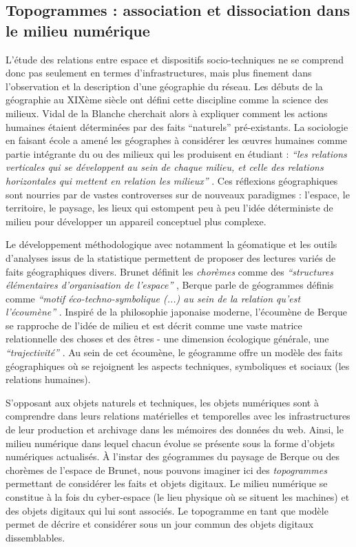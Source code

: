 \subsection[Topogrammes : association et dissociation dans le milieu numérique]{Topogrammes : association et dissociation dans le milieu numérique}

L’étude des relations entre espace et dispositifs socio-techniques ne se comprend donc pas seulement en termes d’infrastructures, mais plus finement dans l’observation et la description d’une géographie du réseau. Les débuts de la géographie au XIXème siècle ont défini cette discipline comme la science des milieux. Vidal de la Blanche cherchait alors à expliquer comment les actions humaines étaient déterminées par des faits ``naturels'' pré-existants. La sociologie en faisant école a amené les géographes à considérer les œuvres humaines comme partie intégrante du ou des milieux qui les produisent \citep{Demangeot1984} en étudiant : \textit{``les relations verticales qui se développent au sein de chaque milieu, et celle des relations horizontales qui mettent en relation les milieux''} \citep{Claval1990}. Ces réflexions géographiques sont nourries par de vastes controverses sur de nouveaux paradigmes : l'espace, le territoire, le paysage, les lieux qui estompent peu à peu l’idée déterministe de milieu pour développer un appareil conceptuel plus complexe. 

Le développement méthodologique avec notamment la géomatique et les outils d’analyses issus de la statistique permettent de proposer des lectures variés de faits géographiques divers. Brunet définit les \textit{chorèmes} comme des \textit{``structures élémentaires d'organisation de l'espace''} \citep{Brunet1980}, Berque parle de géogrammes définis comme \textit{``motif éco-techno-symbolique (...) au sein de la relation qu'est l'écoumène''} \citep{Berque1999}. Inspiré de la philosophie japonaise moderne, l’écoumène de Berque se rapproche de l’idée de milieu et est décrit comme une vaste matrice relationnelle des choses et des êtres - une dimension écologique générale, une \textit{``trajectivité''} \citep{Watsuji2011}. Au sein de cet écoumène, le géogramme offre un modèle des faits géographiques où se rejoignent les aspects techniques, symboliques et sociaux (les relations humaines). 

S’opposant aux objets naturels et techniques, les objets numériques sont à comprendre dans leurs relations matérielles et temporelles avec les infrastructures de leur production et archivage dans les mémoires des données du web. Ainsi, le milieu numérique dans lequel chacun évolue se présente sous la forme d’objets numériques actualisés. À l’instar des géogrammes du paysage de Berque ou des chorèmes de l’espace de Brunet, nous pouvons imaginer ici des \textit{topogrammes} permettant de considérer les faits et objets digitaux. Le milieu numérique se constitue à la fois du cyber-espace (le lieu physique où se situent les machines) et des objets digitaux qui lui sont associés. Le topogramme en tant que modèle permet de décrire et considérer sous un jour commun des objets digitaux dissemblables.

